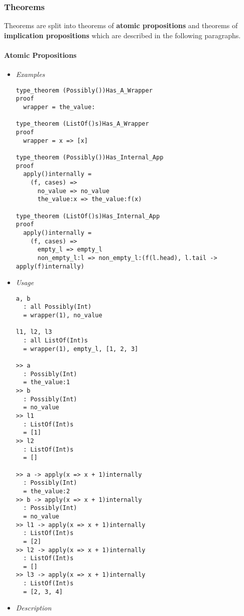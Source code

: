 \documentclass{article}
\begin{document}
\subsubsection{Theorems}
\label{subsubsec:ttheo}

Theorems are split into theorems of \textbf{atomic propositions} and
theorems of \textbf{implication propositions} which are described in the
following paragraphs.

\paragraph{Atomic Propositions}

\begin{itemize}
\item \textit{Examples}

\begin{verbatim}
type_theorem (Possibly())Has_A_Wrapper
proof
  wrapper = the_value:

type_theorem (ListOf()s)Has_A_Wrapper
proof
  wrapper = x => [x]

type_theorem (Possibly())Has_Internal_App
proof
  apply()internally =
    (f, cases) =>
      no_value => no_value
      the_value:x => the_value:f(x)

type_theorem (ListOf()s)Has_Internal_App
proof
  apply()internally =
    (f, cases) =>
      empty_l => empty_l
      non_empty_l:l => non_empty_l:(f(l.head), l.tail -> apply(f)internally)
\end{verbatim}

\item \textit{Usage}

\begin{verbatim} 
a, b
  : all Possibly(Int)
  = wrapper(1), no_value

l1, l2, l3
  : all ListOf(Int)s
  = wrapper(1), empty_l, [1, 2, 3]

>> a
  : Possibly(Int)
  = the_value:1
>> b
  : Possibly(Int)
  = no_value
>> l1
  : ListOf(Int)s
  = [1]
>> l2
  : ListOf(Int)s
  = []

>> a -> apply(x => x + 1)internally
  : Possibly(Int)
  = the_value:2
>> b -> apply(x => x + 1)internally
  : Possibly(Int)
  = no_value
>> l1 -> apply(x => x + 1)internally
  : ListOf(Int)s
  = [2]
>> l2 -> apply(x => x + 1)internally
  : ListOf(Int)s
  = []
>> l3 -> apply(x => x + 1)internally
  : ListOf(Int)s
  = [2, 3, 4]
\end{verbatim}

\item \textit{Description}


\end{itemize}
\end{document}
